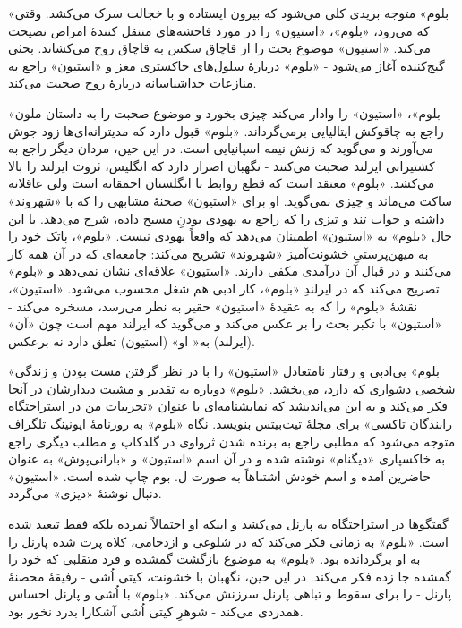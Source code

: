 \documentclass[12pt]{book}
\newcommand{\noun}[1]{«{#1}»}
\begin{document}
    \noun{بلوم} متوجه بریدی کلی می‌شود که بیرون ایستاده و با خجالت سرک می‌کشد. وقتی که می‌رود، \noun{بلوم}، \noun{استیون} را در مورد فاحشه‌های منتقل کنندۀ امراض نصیحت می‌کند. \noun{استیون} موضوع بحث را از قاچاق سکس به قاچاق روح می‌کشاند. بحثی گیج‌کننده آغاز می‌شود - \noun{بلوم} دربارۀ سلول‌های خاکستری مغز و \noun{استیون} راجع به منازعات خداشناسانه دربارۀ روح صحبت می‌کند.

    \noun{بلوم}، \noun{استیون} را وادار می‌کند چیزی بخورد و موضوع صحبت را به داستان ملون راجع به چاقوکش ایتالیایی برمی‌گرداند. \noun{بلوم} قبول دارد که مدیترانه‌ای‌ها زود جوش می‌آورند و می‌گوید که زنش نیمه اسپانیایی است. در این حین، مردان دیگر راجع به کشتیرانی ایرلند صحبت می‌کنند - نگهبان اصرار دارد که انگلیس، ثروت ایرلند را بالا می‌کشد. \noun{بلوم} معتقد است که قطع روابط با انگلستان احمقانه است ولی عاقلانه ساکت می‌ماند و چیزی نمی‌گوید. او برای \noun{استیون} صحنۀ مشابهی را که با \noun{شهروند‬} داشته و جواب تند و تیزی را که راجع به یهودی بودنِ مسیح داده، شرح می‌دهد. با این حال \noun{بلوم} به \noun{استیون} اطمینان می‌دهد که واقعاً یهودی نیست. \noun{بلوم}، پاتک خود را به میهن‌پرستیِ خشونت‌آمیز \noun{شهروند‬} تشریح می‌کند: جامعه‌ای که در آن همه کار می‌کنند و در قبال آن درآمدی مکفی دارند. \noun{استیون} علاقه‌ای نشان نمی‌دهد و \noun{بلوم} تصریح می‌کند که در ایرلندِ \noun{بلوم}، کار ادبی هم شغل محسوب می‌شود. \noun{استیون}، نقشۀ \noun{بلوم} را که به عقیدۀ \noun{استیون} حقیر به نظر می‌رسد، مسخره می‌کند - \noun{استیون} با تکبر بحث را بر عکس می‌کند و می‌گوید که ایرلند مهم است چون «آن» (ایرلند) به« او» (استیون) تعلق دارد نه برعکس.

    \noun{بلوم} بی‌ادبی و رفتار نامتعادل \noun{استیون} را با در نظر گرفتن مست بودن و زندگی شخصی دشواری که دارد، می‌بخشد. \noun{بلوم} دوباره به تقدیر و مشیت دیدارشان در آنجا فکر می‌کند و به این می‌اندیشد که نمایشنامه‌ای با عنوان «تجربیات من در استراحتگاه رانندگان تاکسی» برای مجلۀ تیت‌بیتس بنویسد. نگاه \noun{بلوم} به روزنامۀ ایونینگ تلگراف متوجه می‌شود که مطلبی راجع به برنده شدن ثرواوی در گلدکاپ و مطلب دیگری راجع به خاکسپاری \noun{دیگنام} نوشته شده و در آن اسم \noun{استیون} و «بارانی‌پوش» به عنوان حاضرین آمده و اسم خودش اشتباهاً به صورت ل. بوم چاپ شده است. \noun{استیون} دنبال نوشتۀ \noun{دیزی} می‌گردد.

    گفتگوها در استراحتگاه به پارنل می‌کشد و اینکه او احتمالاً نمرده بلکه فقط تبعید شده است. \noun{بلوم} به زمانی فکر می‌کند که در شلوغی و ازدحامی، کلاه پرت شده پارنل را به او برگردانده بود. \noun{بلوم} به موضوع بازگشت گمشده و فرد متقلبی که خود را گمشده جا زده فکر می‌کند. در این حین، نگهبان با خشونت، کیتی اُشی - رفیقۀ محصنۀ پارنل - را برای سقوط و تباهی پارنل سرزنش می‌کند. \noun{بلوم} با اُشی و پارنل احساس همدردی می‌کند - شوهرِ کیتی اُشی آشکارا بدرد نخور بود.
\end{document}
